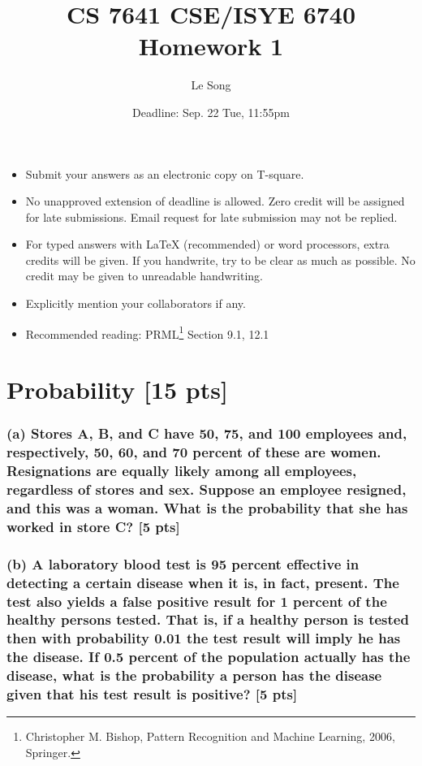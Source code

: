 \documentclass[twoside,10pt]{article}
\begin{document}
\title{CS 7641 CSE/ISYE 6740 Homework 1}
\author{Le Song}
\date{Deadline: Sep. 22 Tue, 11:55pm}
\maketitle

\begin{itemize}
  \item Submit your answers as an electronic copy on T-square.
  \item No unapproved extension of deadline is allowed. Zero credit will be assigned for late submissions. Email request for late submission may not be replied.
  \item For typed answers with LaTeX (recommended) or word processors, extra credits will be given. If you handwrite, try to be clear as much as possible. No credit may be given to unreadable handwriting.
  \item Explicitly mention your collaborators if any.
  \item Recommended reading: PRML\footnote{Christopher M. Bishop, Pattern Recognition and Machine
Learning, 2006, Springer.} Section 9.1, 12.1
\end{itemize}

\section{Probability [15 pts]}

\subsubsection*{(a) Stores A, B, and C have 50, 75, and 100 employees and, respectively, 50, 60, and 70 percent of these are women. Resignations are equally likely among all employees, regardless of stores and sex. Suppose an employee resigned, and this was a woman. What is the probability that she has worked in store C? [5 pts]}

\subsubsection*{(b) A laboratory blood test is 95 percent effective in detecting a certain disease when it is, in fact, present. The test also yields a false positive result for 1 percent of the healthy persons tested. That is, if a healthy person is tested then with probability 0.01 the test result will imply he has the disease. If 0.5 percent of the population actually has the disease, what is the probability a person has the disease given that his test result is positive? [5 pts]}
\end{document}
